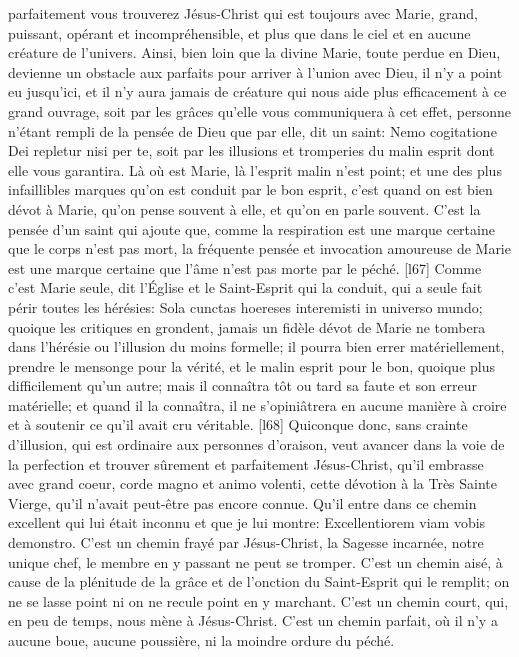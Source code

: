 parfaitement vous trouverez Jésus-Christ qui est toujours avec Marie, grand, puissant, opérant et
incompréhensible, et plus que dans le ciel et en aucune créature de l'univers. Ainsi, bien loin que la divine Marie,
toute perdue en Dieu, devienne un obstacle aux parfaits pour arriver à l'union avec Dieu, il n'y a point eu jusqu'ici,
et il n'y aura jamais de créature qui nous aide plus efficacement à ce grand ouvrage, soit par les grâces qu'elle
vous communiquera à cet effet, personne n'étant rempli de la pensée de Dieu que par elle, dit un saint: Nemo
cogitatione Dei repletur nisi per te, soit par les illusions et tromperies du malin esprit dont elle vous garantira.
 Là où est Marie, là l'esprit malin n'est point; et une des plus infaillibles marques qu'on est conduit par le bon
esprit, c'est quand on est bien dévot à Marie, qu'on pense souvent à elle, et qu'on en parle souvent. C'est la
pensée d'un saint qui ajoute que, comme la respiration est une marque certaine que le corps n'est pas mort, la
fréquente pensée et invocation amoureuse de Marie est une marque certaine que l'âme n'est pas morte par le
péché.
[l67] Comme c'est Marie seule, dit l'Église et le Saint-Esprit qui la conduit, qui a seule fait périr toutes les hérésies:
Sola cunctas hoereses interemisti in universo mundo; quoique les critiques en grondent, jamais un fidèle dévot de
Marie ne tombera dans l'hérésie ou l'illusion du moins formelle; il pourra bien errer matériellement, prendre le
mensonge pour la vérité, et le malin esprit pour le bon, quoique plus difficilement qu'un autre; mais il connaîtra tôt
ou tard sa faute et son erreur matérielle; et quand il la connaîtra, il ne s'opiniâtrera en aucune manière à croire et à
soutenir ce qu'il avait cru véritable.
[l68] Quiconque donc, sans crainte d'illusion, qui est ordinaire aux personnes d'oraison, veut avancer dans la voie
de la perfection et trouver sûrement et parfaitement Jésus-Christ, qu'il embrasse avec grand coeur, corde magno
et animo volenti, cette dévotion à la Très Sainte Vierge, qu'il n'avait peut-être pas encore connue. Qu'il entre dans
ce chemin excellent qui lui était inconnu et que je lui montre: Excellentiorem viam vobis demonstro. C'est un
chemin frayé par Jésus-Christ, la Sagesse incarnée, notre unique chef, le membre en y passant ne peut se
tromper. C'est un chemin aisé, à cause de la plénitude de la grâce et de l'onction du Saint-Esprit qui le remplit; on
ne se lasse point ni on ne recule point en y marchant. C'est un chemin court, qui, en peu de temps, nous mène à
Jésus-Christ. C'est un chemin parfait, où il n'y a aucune boue, aucune poussière, ni la moindre ordure du péché.
